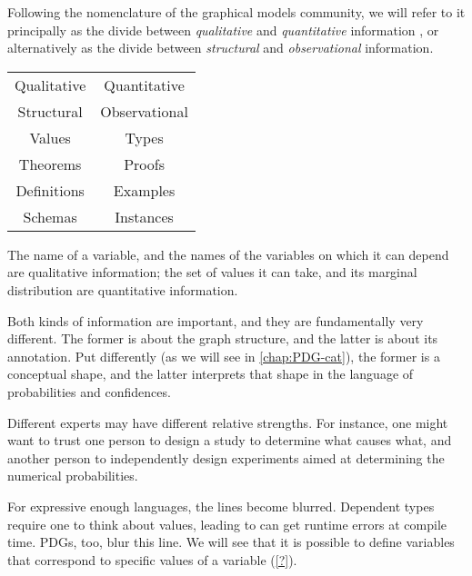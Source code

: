Following the nomenclature of the graphical models community, we will refer to it principally as the divide between \emph{qualitative} and \emph{quantitative} information 
\unskip, or alternatively as the divide between \emph{structural} and \emph{observational} information. 

\begin{center}
\begin{tabular}{c|c}
    Qualitative & Quantitative \\ 
    Structural & Observational \\
    Values & Types \\ 
    Theorems & Proofs \\
    Definitions & Examples \\
    Schemas & Instances 
\end{tabular}
\end{center}

The name of a variable, and the names of the variables on which it can depend are qualitative information; the set of values it can take, and its marginal distribution are quantitative information. 

Both kinds of information are important, and they are fundamentally very different. The former is about the graph structure, and the latter is about its annotation. Put differently (as we will see in \cref{chap:PDG-cat}), the former is a conceptual shape, and the latter interprets that shape in the language of probabilities and confidences. 

Different experts may have different relative strengths.
For instance, one might want to trust one person to design a study to determine what causes what, and another person to independently design experiments aimed at determining the numerical probabilities. 


For expressive enough languages, the lines become blurred. 
Dependent types require one to think about values, leading to can get runtime errors at compile time. 
PDGs, too, blur this line.  We will see that it is possible to define variables that correspond to specific values of a variable (\cref{?}).

